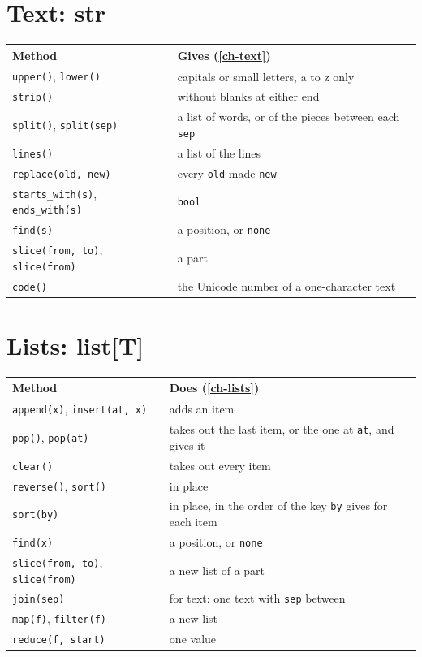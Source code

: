 \section*{Text: str}

\begin{center}
\begin{longtable}{lP{8.1cm}}
\toprule
Method & Gives (\hyperref[ch-text]{\ref*{ch-text}}) \\
\midrule
\endhead
\verb|upper()|, \verb|lower()| & capitals or small letters, a to z only \\
\verb|strip()| & without blanks at either end \\
\verb|split()|, \verb|split(sep)| & a list of words, or of the pieces between each \verb|sep| \\
\verb|lines()| & a list of the lines \\
\verb|replace(old, new)| & every \verb|old| made \verb|new| \\
\verb|starts_with(s)|, \verb|ends_with(s)| & \verb|bool| \\
\verb|find(s)| & a position, or \verb|none| \\
\verb|slice(from, to)|, \verb|slice(from)| & a part \\
\verb|code()| & the Unicode number of a one-character text \\
\bottomrule
\end{longtable}
\end{center}

\section*{Lists: list[T]}

\begin{center}
\begin{longtable}{lP{8.1cm}}
\toprule
Method & Does (\hyperref[ch-lists]{\ref*{ch-lists}}) \\
\midrule
\endhead
\verb|append(x)|, \verb|insert(at, x)| & adds an item \\
\verb|pop()|, \verb|pop(at)| & takes out the last item, or the one at \verb|at|, and gives it \\
\verb|clear()| & takes out every item \\
\verb|reverse()|, \verb|sort()| & in place \\
\verb|sort(by)| & in place, in the order of the key \verb|by| gives for each item \\
\verb|find(x)| & a position, or \verb|none| \\
\verb|slice(from, to)|, \verb|slice(from)| & a new list of a part \\
\verb|join(sep)| & for text: one text with \verb|sep| between \\
\verb|map(f)|, \verb|filter(f)| & a new list \\
\verb|reduce(f, start)| & one value \\
\bottomrule
\end{longtable}
\end{center}


